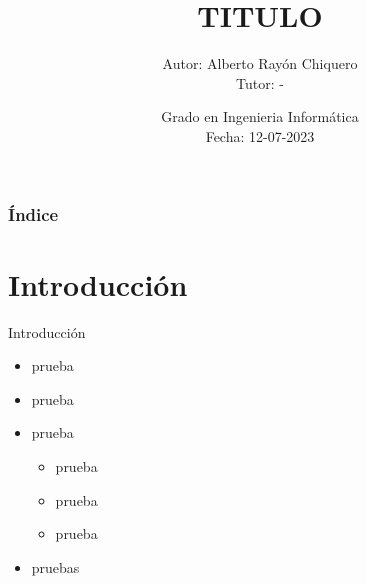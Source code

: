 \documentclass[10pt]{beamer}
\title[Trabajo de fin de grado]{TITULO}%
\author[]{Autor: Alberto Rayón Chiquero \\ Tutor: - }%
\institute[]{Universidad Alfonso X El Sabio \\ GIF}
\date[\textcolor{white}{}]
{Grado en Ingenieria Informática \\ Fecha: 12-07-2023}
\begin{document}
\frame{\titlepage}
\begin{frame}
\frametitle{Índice}
\tableofcontents
\end{frame}



\section{Introducción}
\begin{frame}{Introducción}
        \begin{itemize}
            \item  prueba
            \item  prueba       
            \item  prueba
            	\begin{itemize}
         		    \item  prueba            	
         		    \item  prueba
         		    \item  prueba
            	\end{itemize}
            \item  pruebas
        \end{itemize}



\end{frame}


\end{document}
